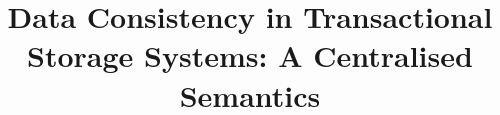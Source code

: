 \documentclass[runningheads,anonymous]{llncs}
\title{%
Data Consistency in Transactional Storage Systems: 
A Centralised Semantics%
}
\author{}
\institute{}
\newcommand{\RootPath}{.}
\begin{document}
\maketitle

\begin{abstract}

\end{abstract}














%
%
%
%
%
%
%
%
\end{document}
